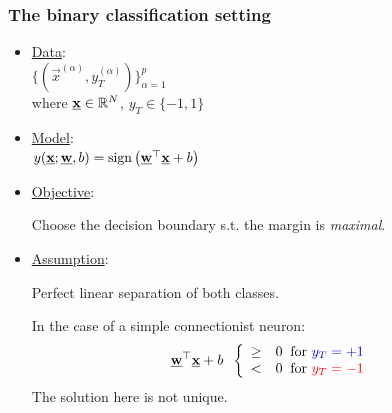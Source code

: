 \begin{frame}\frametitle{The binary classification setting}



\begin{itemize}
	\item \underline{Data}:\\[2mm]
	$
	\Big\{ \left(\vec x^{(\alpha)}, y^{(\alpha)}_{T} \right) \Big\}_{\alpha=1}^{p}\,
	$\\[2mm]
	where $\vec x \in \R^{N}$, $y_T \in \{-1, 1\}$\\

	\item \underline{Model}:\\[2mm]
	$
	y(\vec x; \vec w,b) = \sign \big( \vec w^{\top} \vec x + b \big)
	$
    
    \item \underline{Objective}:
    
    Choose the decision boundary s.t. the margin is \emph{maximal}.
    
    \item \underline{Assumption}:
    
    Perfect linear separation of both classes.
    
    \pause
    
    In the case of a simple connectionist neuron:
    \begin{equation}
    \vec w^{\top} \vec x + b \;\;
    \left \{ \begin{array}{ll}
					\ge& 0 \;\;\text{for } {\color{blue}y_{T} = +1}\\
					<& 0 \;\;\text{for } {\color{red}y_{T} = -1}
				\end{array} \right.  
    \end{equation}
    The solution here is not unique.
    
\end{itemize}
    
\end{frame}


